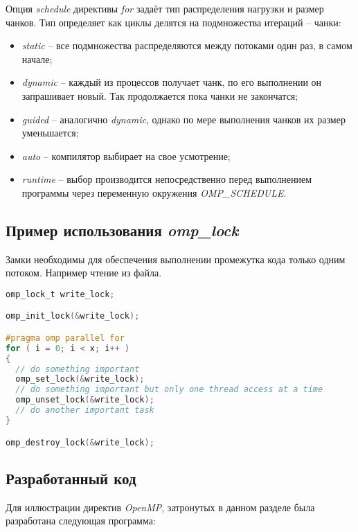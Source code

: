 Опция \textit{schedule} директивы \textit{for} задаёт тип распределения нагрузки и размер чанков. Тип определяет как циклы делятся на подмножества итераций -- чанки:
\begin{itemize}
 \item \textit{static} -- все подмножества распределяются между потоками один раз, в самом начале;
 \item \textit{dynamic} -- каждый из процессов получает чанк, по его выполнении он запрашивает новый. Так продолжается пока чанки не закончатся;
 \item \textit{guided} -- аналогично \textit{dynamic}, однако по мере выполнения чанков их размер уменьшается;
 \item \textit{auto} -- компилятор выбирает на свое усмотрение;
 \item \textit{runtime} -- выбор производится непосредственно перед выполнением программы через переменную окружения \textit{OMP\_SCHEDULE}.
\end{itemize}

\subsection{Пример использования \textit{omp\_lock}}

Замки необходимы для обеспечения выполнении промежутка кода только одним потоком.
Например чтение из файла.

\begin{lstlisting}[language=C]
omp_lock_t write_lock;

omp_init_lock(&write_lock);

#pragma omp parallel for
for ( i = 0; i < x; i++ )
{
  // do something important
  omp_set_lock(&write_lock);
  // do something important but only one thread access at a time
  omp_unset_lock(&write_lock);
  // do another important task
}

omp_destroy_lock(&write_lock);
\end{lstlisting}

\subsection{Разработанный код}

Для иллюстрации директив \textit{OpenMP}, затронутых в данном разделе была разработана следующая программа:

\vspace{0.5cm}
